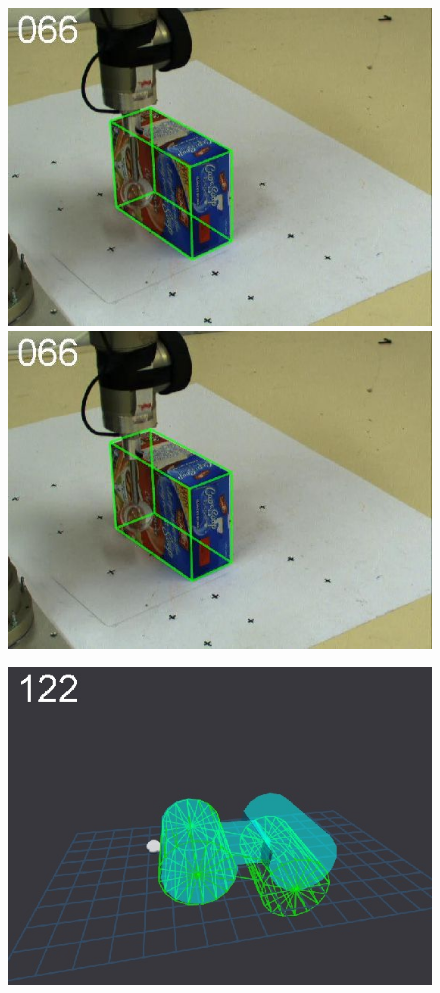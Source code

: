 \begin{figure}[t]
{\includegraphics[width=\imgCXwid]{./C1_2exp_87_1}
\includegraphics[width=\imgCXwid]{./C1_LWPR1_87_1}
}
\centerline{
\includegraphics[width=\imgCXwid]{./C5_1exp_6_2}
}
\end{figure}
